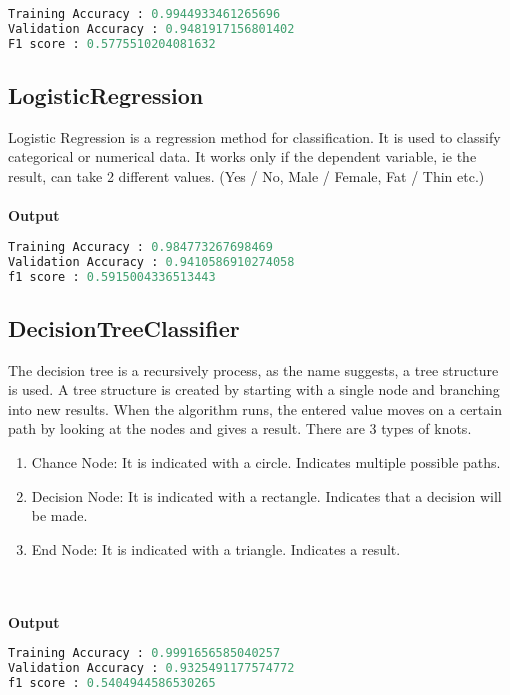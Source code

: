 \documentclass[onecolumn]{article}
\begin{document}
\begin{lstlisting}[language=Python, caption= Accuracy ]
Training Accuracy : 0.9944933461265696
Validation Accuracy : 0.9481917156801402
F1 score : 0.5775510204081632
\end{lstlisting}

\subsection{LogisticRegression}
Logistic Regression is a regression method for classification. It is used to classify categorical or numerical data. It works only if the dependent variable, ie the result, can take 2 different values. (Yes / No, Male / Female, Fat / Thin etc.)
\\\\
\textbf{Output}

\begin{lstlisting}[language=Python, caption= Accuracy ]
Training Accuracy : 0.984773267698469
Validation Accuracy : 0.9410586910274058
f1 score : 0.5915004336513443
\end{lstlisting}

\subsection{DecisionTreeClassifier}
The decision tree is a recursively process, as the name suggests, a tree structure is used. A tree structure is created by starting with a single node and branching into new results. When the algorithm runs, the entered value moves on a certain path by looking at the nodes and gives a result.
There are 3 types of knots.

\begin{enumerate}
\item Chance Node: It is indicated with a circle. Indicates multiple possible paths.
\item Decision Node: It is indicated with a rectangle. Indicates that a decision will be made.
\item End Node: It is indicated with a triangle. Indicates a result.
\end{enumerate}

\\\\
\textbf{Output}

\begin{lstlisting}[language=Python, caption= Accuracy ]
Training Accuracy : 0.9991656585040257
Validation Accuracy : 0.9325491177574772
f1 score : 0.5404944586530265
\end{lstlisting}
\end{document}
